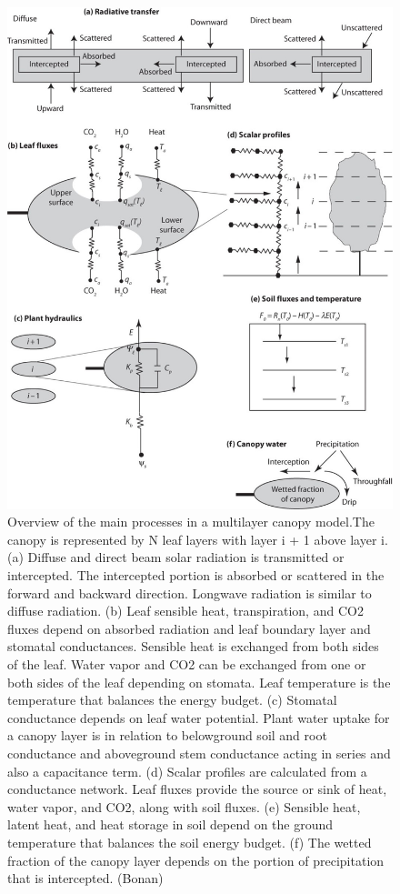 \documentclass[
  12pt,
  oneside]{book}
\begin{document}
\begin{figure}

{\centering \includegraphics[width=0.8\linewidth]{figures/chap3/f325_multilayer_process} 

}

\caption{Overview of the main processes in a multilayer canopy model.The canopy is represented by N leaf layers with layer i + 1 above layer i. (a) Diffuse and direct beam solar radiation is transmitted or intercepted. The intercepted portion is absorbed or scattered in the forward and backward direction. Longwave radiation is similar to diffuse radiation. (b) Leaf sensible heat, transpiration, and CO2 fluxes depend on absorbed radiation and leaf boundary layer and stomatal conductances. Sensible heat is exchanged from both sides of the leaf. Water vapor and CO2 can be exchanged from one or both sides of the leaf depending on stomata. Leaf temperature is the temperature that balances the energy budget. (c) Stomatal conductance depends on leaf water potential. Plant water uptake for a canopy layer is in relation to belowground soil and root conductance and aboveground stem conductance acting in series and also a capacitance term. (d) Scalar profiles are calculated from a conductance network. Leaf fluxes provide the source or sink of heat, water vapor, and CO2, along with soil fluxes. (e) Sensible heat, latent heat, and heat storage in soil depend on the ground temperature that balances the soil energy budget. (f) The wetted fraction of the canopy layer depends on the portion of precipitation that is intercepted. (Bonan)}\label{fig:f325}
\end{figure}
\end{document}
